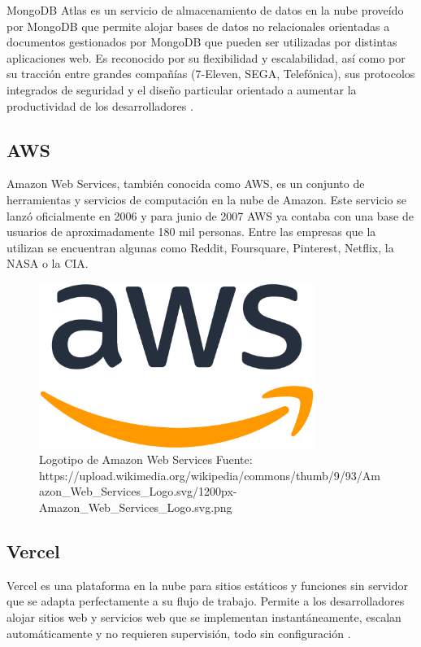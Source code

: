 MongoDB Atlas es un servicio de almacenamiento de datos en la nube proveído por MongoDB que permite alojar bases de datos no relacionales orientadas a documentos gestionados por MongoDB que pueden ser utilizadas por distintas aplicaciones web. Es reconocido por su flexibilidad y escalabilidad, así como por su tracción entre grandes compañías (7-Eleven, SEGA, Telefónica),  sus protocolos integrados de seguridad y el diseño particular orientado a aumentar la productividad de los desarrolladores \cite{mongodbAtlas}.

\subsection{AWS}

Amazon Web Services, también conocida como AWS, es un conjunto de herramientas y servicios de computación en la nube de Amazon. Este servicio se lanzó oficialmente en 2006 y para junio de 2007 AWS ya contaba con una base de usuarios de aproximadamente 180 mil personas. Entre las empresas que la utilizan se encuentran algunas como Reddit, Foursquare, Pinterest, Netflix, la NASA o la CIA.

\begin{figure}[H]
\centering
\includegraphics[width=0.80\textwidth]{img/11.png}
\caption{Logotipo de Amazon Web Services
Fuente: https://upload.wikimedia.org/wikipedia/commons/thumb/9/93/Amazon_Web_Services_Logo.svg/1200px-Amazon_Web_Services_Logo.svg.png}
\label{figure:AwsLogo}
\end{figure}

\subsection{Vercel}

Vercel es una plataforma en la nube para sitios estáticos y funciones sin servidor que se adapta perfectamente a su flujo de trabajo. Permite a los desarrolladores alojar sitios web y servicios web que se implementan instantáneamente, escalan automáticamente y no requieren supervisión, todo sin configuración \cite{vercel}.

